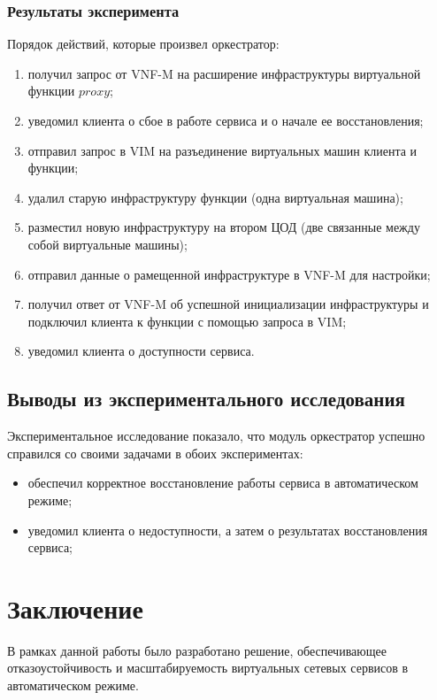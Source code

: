 \documentclass[oneside,final,14pt,a4paper]{extreport}
\begin{document}
\subsection{Результаты эксперимента}
Порядок действий, которые произвел оркестратор:
\begin{enumerate}
	\item получил запрос от VNF-M на расширение инфраструктуры виртуальной функции $proxy$;
	\item уведомил клиента о сбое в работе сервиса и о начале ее восстановления;
	\item отправил запрос в VIM на разъединение виртуальных машин клиента и функции;
	\item удалил старую инфраструктуру функции (одна виртуальная машина);
	\item разместил новую инфраструктуру на втором ЦОД (две связанные между собой виртуальные машины);
	\item отправил данные о рамещенной инфраструктуре в VNF-M для настройки;
	\item получил ответ от VNF-M об успешной инициализации инфраструктуры и подключил клиента к функции с помощью запроса в VIM;
	\item уведомил клиента о доступности сервиса.
\end{enumerate}


\section{Выводы из экспериментального исследования}
Экспериментальное исследование показало, что модуль оркестратор успешно справился со своими задачами в обоих экспериментах:
\begin{itemize}
	\item обеспечил корректное восстановление работы сервиса в автоматическом режиме;
	\item уведомил клиента о недоступности, а затем о результатах восстановления сервиса;
\end{itemize}





\chapter*{Заключение}
В рамках данной работы было разработано решение, обеспечивающее отказоустойчивость и масштабируемость виртуальных сетевых сервисов в автоматическом режиме.
\end{document}
